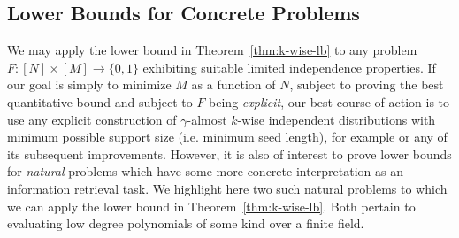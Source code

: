 \documentclass[11pt]{article}
\newcommand{\B}{\{0,1\}}
\begin{document}
\subsection{Lower Bounds for Concrete Problems}
We may apply the lower bound in Theorem~\ref{thm:k-wise-lb} to any problem $F: [N] \times [M] \to \B$ exhibiting suitable limited independence properties. If our goal is simply to minimize $M$ as a function of $N$, subject to proving the best quantitative bound and subject to $F$ being \emph{explicit}, our best course of action is to use any explicit construction of $\gamma$-almost $k$-wise independent distributions with minimum possible support size (i.e. minimum seed length), for example \cite{naornaor} or any of its subsequent improvements. However, it is also of interest to prove lower bounds for \emph{natural} problems which have some more concrete interpretation as an information retrieval task. 
We highlight here two such natural problems to which we can apply the lower bound in Theorem~\ref{thm:k-wise-lb}. Both pertain to evaluating low degree polynomials of some kind over a finite field.
\end{document}
